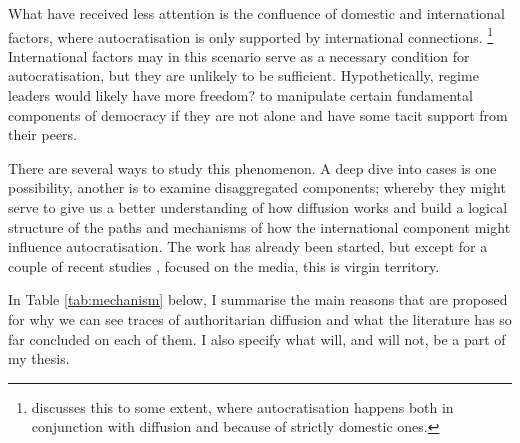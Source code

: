 What have received less attention is the confluence of domestic and international factors, where autocratisation is only supported by international connections. \footnote{\citet{buzogany_illiberal_2017} discusses this to some extent, where autocratisation happens both in conjunction with diffusion and because of strictly domestic ones.} International factors may in this scenario serve as a necessary condition for autocratisation, but they are unlikely to be sufficient. Hypothetically, regime leaders would likely have more freedom? to manipulate certain fundamental components of democracy if they are not alone and have some tacit support from their peers. 

There are several ways to study this phenomenon. A deep dive into cases is one possibility, another is to examine disaggregated components; whereby they might serve to give us a better understanding of how diffusion works and build a logical structure of the paths and mechanisms of how the international component might influence autocratisation. The work has already been started, but except for a couple of recent studies \citep{gamso_is_2021, toettoe_foreign_2023}, focused on the media, this is virgin territory. 

In Table \ref{tab:mechanism} below, I summarise the main reasons that are proposed for why we can see traces of authoritarian diffusion and what the literature has so far concluded on each of them. I also specify what will, and will not, be a part of my thesis.


